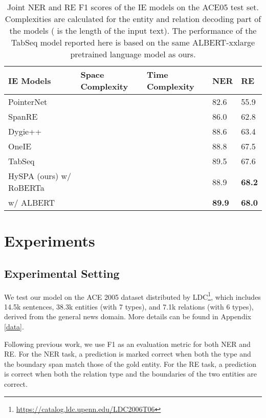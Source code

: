 \documentclass[11pt,a4paper]{article}
\begin{document}
 







\begin{table*}
\centering
\begin{tabular}{lllll}
\hline
\textbf{IE Models} & \textbf{Space Complexity} & \textbf{Time Complexity}  &\textbf{NER} & \textbf{RE} \\
\hline
PointerNet \cite{ptr} &  & & 82.6 & 55.9 \\
SpanRE \cite{dixit-al-onaizan-2019-span} &  &   & 86.0 & 62.8\\
Dygie++ \cite{dygie} &  & & 88.6 & 63.4 \\
OneIE \cite{lin-etal-2020-joint} &  & &88.8 & 67.5 \\
TabSeq \cite{tse} &  & & 89.5 & 67.6 \\
\hline
HySPA (ours) \quad w/ RoBERTa  & \multirow{2}{4em}{} &\multirow{2}{4em}{}& 88.9 & \textbf{68.2} \\
\quad \quad \quad \quad\quad \quad\quad w/ ALBERT &  & & \textbf{89.9} & \textbf{68.0} \\
\hline
\end{tabular}
\caption{\label{res}
Joint NER and RE F1 scores of the IE models on the ACE05 test set.  Complexities are calculated for the entity and relation decoding part of the models ( is the length of the input text). The performance of the TabSeq model reported here is based on the same ALBERT-xxlarge \cite{albert} pretrained language model as ours.
}
\end{table*}


\section{Experiments}


\subsection{Experimental Setting}


We test our model on the ACE 2005 dataset distributed by LDC\footnote{\url{https://catalog.ldc.upenn.edu/LDC2006T06}},  which includes 14.5k sentences, 38.3k entities (with 7 types), and 7.1k relations (with 6 types), derived from the general news domain. More details can be found in Appendix \ref{data}.

Following previous work, we use F1 as an evaluation metric for both NER and RE. For the NER task, a prediction is marked correct when both the type and the boundary span match those of the gold entity. For the RE task, a prediction is correct when both the relation type and the boundaries of the two entities are correct.  
\end{document}
